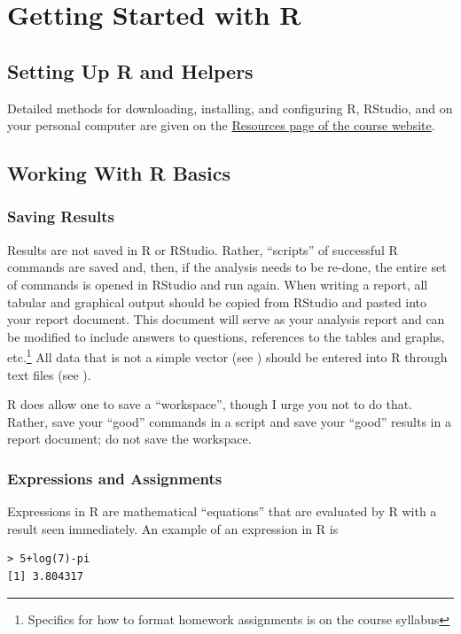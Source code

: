 \documentclass[10pt,openany]{book}\usepackage[]{graphicx}\usepackage[]{color}
\makeatletter
\newenvironment{kframe}{%
 \def\at@end@of@kframe{}%
 \ifinner\ifhmode%
  \def\at@end@of@kframe{\end{minipage}}%
  \begin{minipage}{\columnwidth}%
 \fi\fi%
 \def\FrameCommand##1{\hskip\@totalleftmargin \hskip-\fboxsep
 \colorbox{shadecolor}{##1}\hskip-\fboxsep
     \hskip-\linewidth \hskip-\@totalleftmargin \hskip\columnwidth}%
 \MakeFramed {\advance\hsize-\width
   \@totalleftmargin\z@ \linewidth\hsize
   \@setminipage}}%
 {\par\unskip\endMakeFramed%
 \at@end@of@kframe}
\newenvironment{knitrout}{}{} %
\makeatother
\begin{document}
\chapter{Getting Started with R} \label{chap:FoundationsR}

\minitoc

\section{Setting Up R and Helpers} \label{sect:RSetup}
Detailed methods for downloading, installing, and configuring R, RStudio, and  on your personal computer are given on the \href{http://derekogle.com/NCMTH107/resources/}{Resources page of the course website}.

\section{Working With R Basics} \label{sect:RBasics}
\subsection{Saving Results} \label{sect:RSaving}
Results are not saved in R or RStudio.  Rather, ``scripts'' of successful R commands are saved and, then, if the analysis needs to be re-done, the entire set of commands is opened in RStudio and run again.  When writing a report, all tabular and graphical output should be copied from RStudio and pasted into your report document.  This document will serve as your analysis report and can be modified to include answers to questions, references to the tables and graphs, etc.\footnote{Specifics for how to format homework assignments is on the course syllabus}  All data that is not a simple vector (see ) should be entered into R through text files (see ).

R does allow one to save a ``workspace'', though I urge you not to do that.  Rather, save your ``good'' commands in a script and save your ``good'' results in a report document; do not save the workspace.



\subsection{Expressions and Assignments} \label{sect:RExprAssn}
Expressions in R are mathematical ``equations'' that are evaluated by R with a result seen immediately.  An example of an expression in R is
\begin{knitrout}
\color{fgcolor}\begin{kframe}
\begin{verbatim}
> 5+log(7)-pi
[1] 3.804317
\end{verbatim}
\end{kframe}
\end{knitrout}
\end{document}
